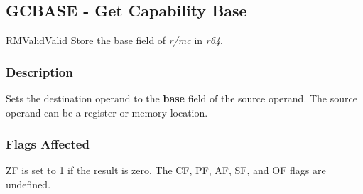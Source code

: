 \clearpage
{}
{}
\subsection*{GCBASE - Get Capability Base}

\begin{x86opcodetable}
  {RM}{Valid}{Valid}
  {Store the base field of \emph{r/mc} in \emph{r64}.}
\end{x86opcodetable}

\begin{x86opentable}
\end{x86opentable}

\subsubsection*{Description}

Sets the destination operand to the \textbf{base} field of the source
operand.  The source operand can be a register or memory location.

\subsubsection*{Flags Affected}

ZF is set to 1 if the result is zero.  The CF, PF, AF, SF, and OF
flags are undefined.
